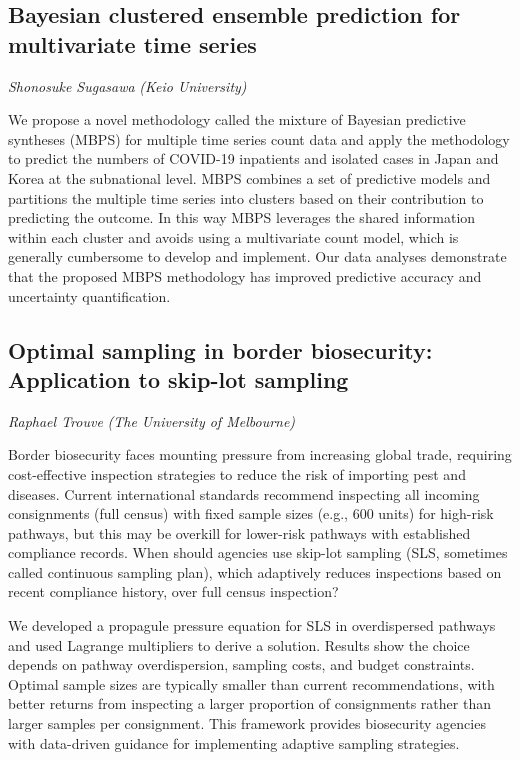 \documentclass[
]{scrreprt}
\begin{document}
\subsection{Bayesian clustered ensemble prediction for multivariate time
series}\label{bayesian-clustered-ensemble-prediction-for-multivariate-time-series}

\emph{Shonosuke Sugasawa} \emph{(Keio
University)}

\setlength{\parskip}{0.5em}

We propose a novel methodology called the mixture of Bayesian predictive
syntheses (MBPS) for multiple time series count data and apply the
methodology to predict the numbers of COVID-19 inpatients and isolated
cases in Japan and Korea at the subnational level. MBPS combines a set
of predictive models and partitions the multiple time series into
clusters based on their contribution to predicting the outcome. In this
way MBPS leverages the shared information within each cluster and avoids
using a multivariate count model, which is generally cumbersome to
develop and implement. Our data analyses demonstrate that the proposed
MBPS methodology has improved predictive accuracy and uncertainty
quantification.

\subsection{Optimal sampling in border biosecurity: Application to
skip-lot
sampling}\label{optimal-sampling-in-border-biosecurity-application-to-skip-lot-sampling}

\emph{Raphael Trouve} \emph{(The University of
Melbourne)}

\setlength{\parskip}{0.5em}

Border biosecurity faces mounting pressure from increasing global trade,
requiring cost-effective inspection strategies to reduce the risk of
importing pest and diseases. Current international standards recommend
inspecting all incoming consignments (full census) with fixed sample
sizes (e.g., 600 units) for high-risk pathways, but this may be overkill
for lower-risk pathways with established compliance records. When should
agencies use skip-lot sampling (SLS, sometimes called continuous
sampling plan), which adaptively reduces inspections based on recent
compliance history, over full census inspection?

We developed a propagule pressure equation for SLS in overdispersed
pathways and used Lagrange multipliers to derive a solution. Results
show the choice depends on pathway overdispersion, sampling costs, and
budget constraints. Optimal sample sizes are typically smaller than
current recommendations, with better returns from inspecting a larger
proportion of consignments rather than larger samples per consignment.
This framework provides biosecurity agencies with data-driven guidance
for implementing adaptive sampling strategies.
\end{document}
